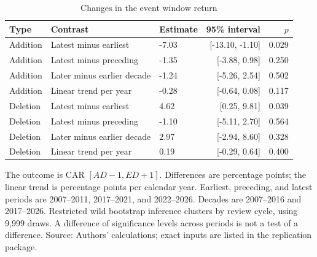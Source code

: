 \begin{table}[!htbp]
\centering
\caption{Changes in the event window return}\label{tab:contrasts}
\small
\setlength{\tabcolsep}{5pt}
\begin{tabular}{lllrr}
\toprule
Type & Contrast & Estimate & 95\% interval & $p$ \\
\midrule
Addition & Latest minus earliest & -7.03 & [-13.10, -1.10] & 0.029 \\
Addition & Latest minus preceding & -1.35 & [-3.88, 0.98] & 0.250 \\
Addition & Later minus earlier decade & -1.24 & [-5.26, 2.54] & 0.502 \\
Addition & Linear trend per year & -0.28 & [-0.64, 0.08] & 0.117 \\
Deletion & Latest minus earliest & 4.62 & [0.25, 9.81] & 0.039 \\
Deletion & Latest minus preceding & -1.10 & [-5.11, 2.70] & 0.564 \\
Deletion & Later minus earlier decade & 2.97 & [-2.94, 8.60] & 0.328 \\
Deletion & Linear trend per year & 0.19 & [-0.29, 0.64] & 0.400 \\
\bottomrule
\end{tabular}
\begin{minipage}{\linewidth}\footnotesize\vspace{5pt}
The outcome is CAR $[AD-1,ED+1]$. Differences are percentage points; the linear trend is percentage points per calendar year. Earliest, preceding, and latest periods are 2007--2011, 2017--2021, and 2022--2026. Decades are 2007--2016 and 2017--2026. Restricted wild bootstrap inference clusters by review cycle, using 9,999 draws. A difference of significance levels across periods is not a test of a difference. Source: Authors' calculations; exact inputs are listed in the replication package.
\end{minipage}
\end{table}
